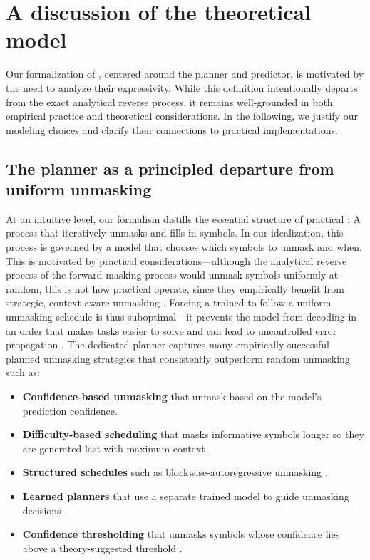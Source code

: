 \section{A discussion of the theoretical model} \label{app:theoretical-model} 

Our formalization of \MDMsAcr, centered around the planner and predictor, is motivated by the need to analyze their expressivity.
While this definition intentionally departs from the exact analytical reverse process, it remains well-grounded in both empirical practice and theoretical considerations.
In the following, we justify our modeling choices and clarify their connections to practical implementations.

\subsection{The planner as a principled departure from uniform unmasking} \label{app:planner-centrality}

At an intuitive level, our formalism distills the essential structure of practical \MDMsAcr: A process that iteratively unmasks and fills in symbols.
In our idealization, this process is governed by a model that chooses which symbols to unmask and when.
This is motivated by practical considerations---although the analytical reverse process of the \MDMAcr forward masking process would unmask symbols uniformly at random, this is not how practical \MDMsAcr operate, since they empirically benefit from strategic, context-aware unmasking \citep{ghazvininejad-etal-2019-mask,peng2025pathplanningmaskeddiffusion,zheng2024reparameterizeddiscretediffusionmodel,liu2025thinkgeneratediscretediffusion,kim2025trainworstplanbest,benhamu2025acceleratedsamplingmaskeddiffusion}.
Forcing a trained \MDMAcr to follow a uniform unmasking schedule is thus suboptimal---it prevents the model from decoding in an order that makes tasks easier to solve \citep{kim2025trainworstplanbest} and can lead to uncontrolled error propagation \citep{ghazvininejad-etal-2019-mask}.
The dedicated planner captures many empirically successful planned unmasking strategies that consistently outperform random unmasking such as:
\begin{itemize}
   \item \textbf{Confidence-based unmasking} that unmask based on the model's prediction confidence.
   \item \textbf{Difficulty-based scheduling} that masks informative symbols longer so they are generated last with maximum context \citep{he-etal-2023-diffusionbert}.
   \item \textbf{Structured schedules} such as blockwise-autoregressive unmasking \citep{nie2025largelanguagediffusionmodels}.
   \item \textbf{Learned planners} that use a separate trained model to guide unmasking decisions \citep{peng2025pathplanningmaskeddiffusion}.
   \item \textbf{Confidence thresholding} that unmasks symbols whose confidence lies above a theory-suggested threshold \citep{wu2025fastdllmtrainingfreeaccelerationdiffusion}.
\end{itemize}

